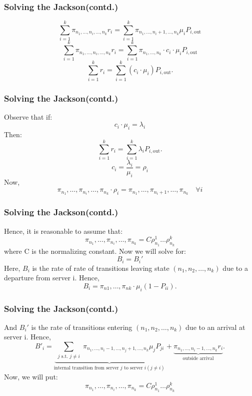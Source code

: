 \documentclass[10pt,notes]{beamer}
\begin{document}
\begin{frame}
    \frametitle{Solving the Jackson(contd.)}
        \[
        \sum_{i=1}^{k} \pi_{n_1,\ldots,n_i,\ldots,n_k} r_i = \sum_{i=1}^{k} \pi_{n_1,\ldots,n_i+1,\ldots,n_k} \mu_i P_{i,\text{out}}
        \]
        \[
        \sum_{i=1}^{k} \pi_{n_1,\ldots,n_i,\ldots,n_k} r_i = \sum_{i=1}^{k} \pi_{n_1,\ldots,n_k} \cdot c_i \cdot \mu_i P_{i,\text{out}}
        \]
        \[
        \sum_{i=1}^{k} r_i = \sum_{i=1}^{k} (c_i \cdot \mu_i) P_{i,\text{out}}.
        \]

    
\end{frame}
\begin{frame}
    \frametitle{Solving the Jackson(contd.)}
    Observe that if:
    \[c_i \cdot \mu_i = \lambda_i\]
    Then:
    \[\sum_{i=1}^{k} r_i = \sum_{i=1}^{k} \lambda_i P_{i,\text{out}}.\] \[c_i = \frac{\lambda_i}{\mu_i} = \rho_i\]
    Now,
    \[\pi_{n_1}, \ldots, \pi_{n_i}, \ldots, \pi_{n_k} \cdot \rho_i = \pi_{n_1}, \ldots, \pi_{n_i+1}, \ldots, \pi_{n_k} \quad \forall i\]
    
\end{frame}

\begin{frame}
    \frametitle{Solving the Jackson(contd.)}
    Hence, it is reasonable to assume that:
    \[\pi_{n_1}, \ldots, \pi_{n_i}, \ldots, \pi_{n_k} = C \rho_{n_1}^{1} \ldots \rho_{n_k}^{k}\]
    where C is the normalizing constant. Now we will solve for:
    \[B_i = B_i'\]
    Here, \(B_i\) is the rate of rate of transitions leaving state \((n_1, n_2, \ldots, n_k)\) due to a departure from server i. Hence,
    \[B_i = \pi_{n1}, \ldots, \pi_{nk} \cdot \mu_i(1 - P_{ii}).\]
\end{frame}

\begin{frame}
    \frametitle{Solving the Jackson(contd.)}
    And \(B_i'\) is the rate of transitions entering \((n_1, n_2, \ldots, n_k)\) due to an arrival at server i. Hence,
    \[
        B'_i = \underbrace{\sum_{\substack{j \text{ s.t. } j \neq i}} \pi_{n_1,\ldots,n_i-1,\ldots,n_j+1,\ldots,n_k} \mu_j P_{ji}}_{\text{internal transition from server } j \text{ to server } i (j \neq i)} + \underbrace{\pi_{n_1,\ldots,n_i-1,\ldots,n_k} r_i}_{\text{outside arrival}}.
    \]
    Now, we will put:
    \[\pi_{n_1}, \ldots, \pi_{n_i}, \ldots, \pi_{n_k} = C \rho_{n_1}^{1} \ldots \rho_{n_k}^{k}\]

\end{frame}
\end{document}
